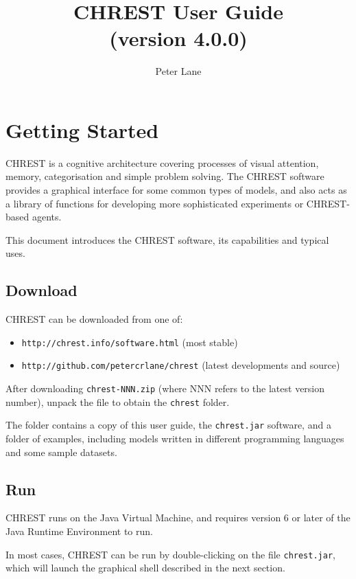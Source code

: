 \documentclass{article}
\title{CHREST User Guide \\ (version 4.0.0)}
\author{Peter Lane}
\begin{document}
\maketitle
\tableofcontents

\newpage
\section{Getting Started}

CHREST is a cognitive architecture covering processes of visual attention,
memory, categorisation and simple problem solving.  The CHREST software
provides a graphical interface for some common types of models, and also acts
as a library of functions for developing more sophisticated experiments or
CHREST-based agents.

This document introduces the CHREST software, its capabilities and typical 
uses. 

\subsection{Download}

CHREST can be downloaded from one of:

\begin{itemize}
\item {\tt http://chrest.info/software.html}  (most stable)
\item {\tt http://github.com/petercrlane/chrest} (latest developments and source)
\end{itemize}

\noindent After downloading {\tt chrest-NNN.zip} (where NNN refers to the
latest version number), unpack the file to obtain the {\tt chrest} folder.

The folder contains a copy of this user guide, the {\tt chrest.jar} software, 
and a folder of examples, including models written in different programming 
languages and some sample datasets.

\subsection{Run}

CHREST runs on the Java Virtual Machine, and requires version 6 or later of the 
Java Runtime Environment to run.

In most cases, CHREST can be run by double-clicking on the file {\tt chrest.jar}, 
which will launch the graphical shell described in the next section.
\end{document}

